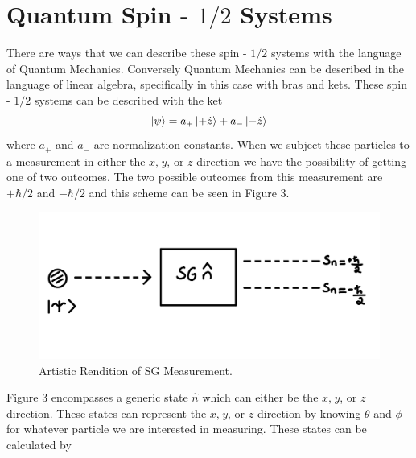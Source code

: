 \documentclass[twocolumn]{article}
\begin{document}
\section*{Quantum Spin - $1/2$ Systems}
There are ways that we can describe these spin - $1/2$ systems with the language of Quantum Mechanics. Conversely Quantum Mechanics can be described in the language of linear algebra, specifically in this case with bras and kets. These spin - $1/2$ systems can be described with the ket 
\begin{equation}
\ket{\psi}=a_{+}\ket{+\hat{z}}+a_{-}\ket{-\hat{z}}
\end{equation}
where $a_{+}$ and $a_{-}$ are normalization constants. When we subject these particles to a measurement in either the $x, \hspace{1pt} y$, or $z$ direction we have the possibility of getting one of two outcomes. The two possible outcomes from this measurement are $+\hbar/2$ and $-\hbar/2$ and this scheme can be seen in Figure 3. \\
\begin{figure}[htpb]
\begin{center}
\includegraphics[width=0.90\linewidth]{SG-Measurement.PNG}
\caption{Artistic Rendition of SG Measurement.}
\end{center}
\end{figure}
\newline
Figure 3 encompasses a generic state $\hat{n}$ which can either be the $x, \hspace{1pt} y$, or $z$ direction. These states can represent the $x, \hspace{1pt} y$, or $z$ direction by knowing $\theta$ and $\phi$ for whatever particle we are interested in measuring. These states can be calculated by
\end{document}
